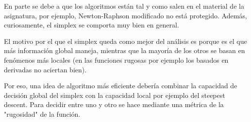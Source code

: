 \documentclass[10pt]{article}
\theoremstyle{definition}
\begin{document}
En parte se debe a que los algoritmos están tal y como salen en el material 
de la asignatura, por ejemplo, Newton-Raphson modificado no está protegido. 
Además, curiosamente, el simplex se comporta muy bien en general.

El motivo por el que el simplex queda como mejor del análisis es porque 
es el que más información global maneja, mientras que la mayoría de los otros
se basan en fenómenos más locales (en las funciones rugosas por ejemplo
los basados en derivadas no aciertan bien).

Por eso, una idea de algoritmo más eficiente debería combinar la capacidad de
decisión global del simplex con la capacidad local por ejemplo del steepest
descent. Para decidir entre uno y otro se hace mediante una métrica de la
"rugosidad" de la función.
\end{document}
